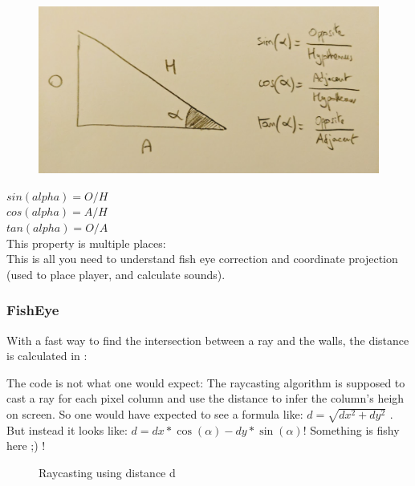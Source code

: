 \par
\begin{figure}[H]
  \centering
 \includegraphics[width=\textwidth]{imgs/sohcahtoa.png}
\end{figure}
\par
$ sin(alpha) = O/H$\\
$ cos(alpha) = A/H$\\
$ tan(alpha) = O/A$\\
This property is multiple places:\\
This is all you need to understand fish eye correction and coordinate projection (used to place player, and calculate sounds).












\subsubsection{FishEye}
With a fast way to find the intersection between a ray and the walls, the distance is calculated in :\\

\begin{minipage}{\textwidth}

\end{minipage}

The code is not what one would expect: The raycasting algorithm is supposed to cast a ray for each pixel column and use the distance  to infer the column's heigh on screen. So one would have expected to see a formula like:
$ d = \sqrt{dx^2 + dy^2}$ . But instead it looks like: $d = dx * \cos(\alpha) - dy * \sin(\alpha) $! Something is fishy here ;) !\\
\par
\begin{figure}[H]
\centering
 
 \caption{Raycasting using distance d} \label{fig:Raycasting2}
\end{figure}

